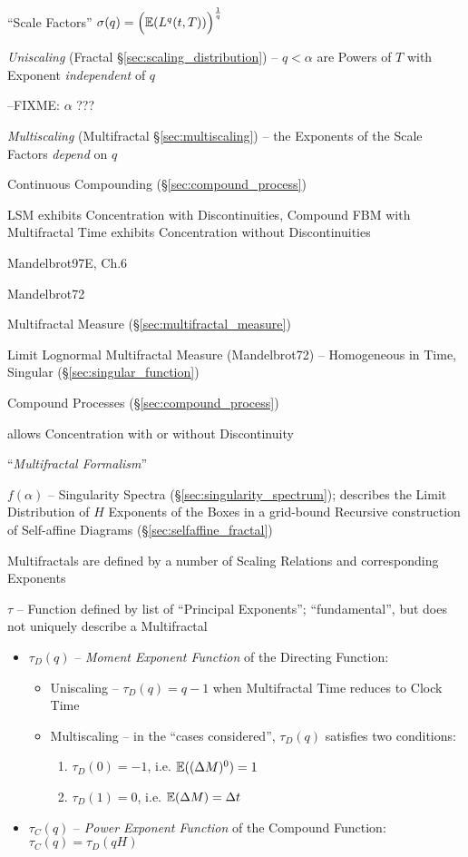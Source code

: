 ``Scale Factors'' $\sigma(q) = \Big(\mathbb{E}(L^q(t, T))\Big)^{\frac{1}{q}}$

\emph{Uniscaling} (Fractal \S\ref{sec:scaling_distribution}) -- $q < \alpha$ are
Powers of $T$ with Exponent \emph{independent} of $q$

--FIXME: $\alpha$ ???

\emph{Multiscaling} (Multifractal \S\ref{sec:multiscaling}) -- the Exponents of
the Scale Factors \emph{depend} on $q$

Continuous Compounding (\S\ref{sec:compound_process})

LSM exhibits Concentration with Discontinuities, Compound FBM with Multifractal
Time exhibits Concentration without Discontinuities

Mandelbrot97E, Ch.6

Mandelbrot72

Multifractal Measure (\S\ref{sec:multifractal_measure})

Limit Lognormal Multifractal Measure (Mandelbrot72) -- Homogeneous in Time,
Singular (\S\ref{sec:singular_function})

Compound Processes (\S\ref{sec:compound_process})

allows Concentration with or without Discontinuity

``\emph{Multifractal Formalism}''

$f(\alpha)$ -- Singularity Spectra (\S\ref{sec:singularity_spectrum}); describes
the Limit Distribution of $H$ Exponents of the Boxes in a grid-bound Recursive
construction of Self-affine Diagrams (\S\ref{sec:selfaffine_fractal})

Multifractals are defined by a number of Scaling Relations and corresponding
Exponents

$\tau$ -- Function defined by list of ``Principal Exponents''; ``fundamental'',
but does not uniquely describe a Multifractal

\begin{itemize}
  \item $\tau_D(q)$ -- \emph{Moment Exponent Function} of the Directing
    Function:
    \begin{itemize}
      \item Uniscaling -- $\tau_D(q) = q - 1$ when Multifractal Time reduces to
        Clock Time
      \item Multiscaling -- in the ``cases considered'', $\tau_D(q)$ satisfies
        two conditions:
        \begin{enumerate}
          \item $\tau_D(0) = -1$, i.e. $\mathbb{E}((\Delta M)^0) = 1$
          \item $\tau_D(1) = 0$, i.e. $\mathbb{E}(\Delta M) = \Delta t$
        \end{enumerate}
    \end{itemize}
  \item $\tau_C(q)$ -- \emph{Power Exponent Function} of the Compound Function:
    $\tau_C(q) = \tau_D(qH)$
\end{itemize}

